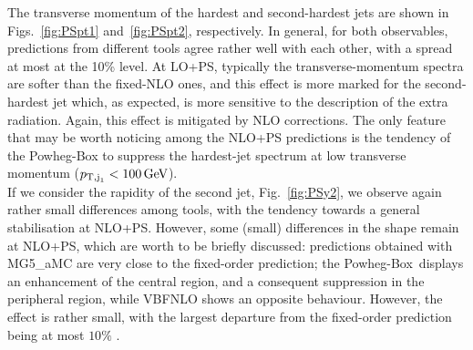 The transverse momentum of the hardest and second-hardest jets are shown in Figs.~\ref{fig:PSpt1} and~\ref{fig:PSpt2}, respectively. In general, for both observables,
predictions from different tools agree rather well with each other, with a spread at most at the 10\% level. At LO+PS, typically the transverse-momentum spectra are softer than
the fixed-NLO ones, and this effect is more marked for the second-hardest jet which, as expected, is more sensitive to the description of the extra radiation. Again, this
effect is mitigated by NLO corrections. The only feature that may be worth noticing among the NLO+PS predictions is the tendency of the {\sc Powheg-Box} to suppress the
hardest-jet spectrum at low transverse momentum ($p_{\text{T},\text{j}_1}<100 \,\text{GeV}$).\\
If we consider the rapidity of the second jet, Fig.~\ref{fig:PSy2}, we observe again rather small differences among tools, with the tendency towards a general
stabilisation at NLO+PS. However, some (small) differences in the shape remain at NLO+PS, which are worth to be briefly discussed: predictions
obtained with {\sc MG5\_aMC} are very close to the fixed-order prediction; the {\sc Powheg-Box}\ displays an enhancement of the central region, and a consequent suppression in the
peripheral region, while {\sc VBFNLO} shows an opposite behaviour. However, the effect is rather small, with the largest departure from the fixed-order prediction being
at most $10\%$ .



